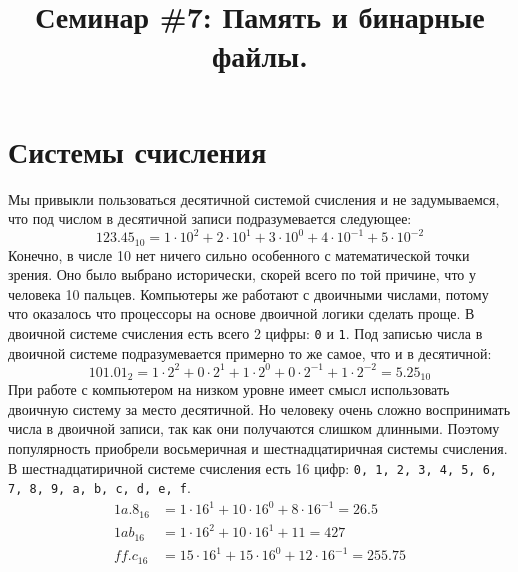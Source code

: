 \documentclass{article}
\begin{document}

\newpage

\title{Семинар \#7: Память и бинарные файлы.\vspace{-5ex}}\date{}\maketitle

\section*{Системы счисления}
Мы привыкли пользоваться десятичной системой счисления и не задумываемся, что под числом в десятичной записи подразумевается следующее:
$$
123.45_{10} = 1 \cdot 10^2 + 2 \cdot 10^1 + 3 \cdot 10^0 + 4 \cdot 10^{-1} + 5 \cdot 10^{-2}
$$
Конечно, в числе 10 нет ничего сильно особенного с математической точки зрения. Оно было выбрано исторически, скорей всего по той причине, что у человека 10 пальцев. Компьютеры же работают с двоичными числами, потому что оказалось что процессоры на основе двоичной логики сделать проще. В двоичной системе счисления есть всего 2 цифры: \texttt{0} и \texttt{1}. Под записью числа в двоичной системе подразумевается примерно то же самое, что и в десятичной:
$$
101.01_2 = 1 \cdot 2^2 + 0 \cdot 2^1 + 1 \cdot 2^0 + 0 \cdot 2^{-1} + 1 \cdot 2^{-2} = 5.25_{10}
$$
При работе с компьютером на низком уровне имеет смысл использовать двоичную систему за место десятичной.  Но человеку очень сложно воспринимать числа в двоичной записи, так как они получаются слишком длинными. Поэтому популярность приобрели восьмеричная и шестнадцатиричная системы счисления. В шестнадцатиричной системе счисления есть 16 цифр: \texttt{0, 1, 2, 3, 4, 5, 6, 7, 8, 9, a, b, c, d, e, f}.
\begin{align*}
1a.8_{16} &= 1 \cdot 16^1 + 10 \cdot 16^0 + 8 \cdot 16^{-1} = 26.5\\
1ab_{16}  &= 1 \cdot 16^2 + 10 \cdot 16^1 + 11 = 427\\
ff.c_{16} &= 15 \cdot 16^ 1 + 15 \cdot 16^0 + 12 \cdot 16^{-1} = 255.75
\end{align*}
\end{document}
